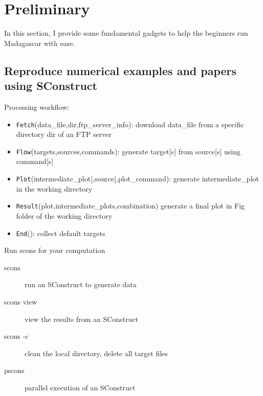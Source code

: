 \section{Preliminary}

In this section, I provide some fundamental gadgets to help the beginners run Madagascar with ease.

\subsection{Reproduce numerical examples and papers using SConstruct}

  Processing workflow:
  \begin{itemize}
    \item \texttt{Fetch}(data\_file,dir,ftp\_server\_info): download data\_file from a specific directory dir of an FTP server
    \item \texttt{Flow}(targets,sources,commands): generate target[s]  from source[s] using command[s]
    \item \texttt{Plot}(intermediate\_plot[,source],plot\_command): generate intermediate\_plot in the working directory
    \item \texttt{Result}(plot,intermediate\_plots,combination) generate a final plot  in Fig folder of the working directory
    \item \texttt{End}(): collect default targets 
  \end{itemize}
  \vspace{1em}
  Run scons for your computation
  \begin{description}
    \item[scons] run an SConstruct to generate data
    \item[scons view] view the results from an SConstruct
    \item[scons -c] clean the local directory, delete all target files
    \item[pscons] parallel execution of an SConstruct 
  \end{description}


